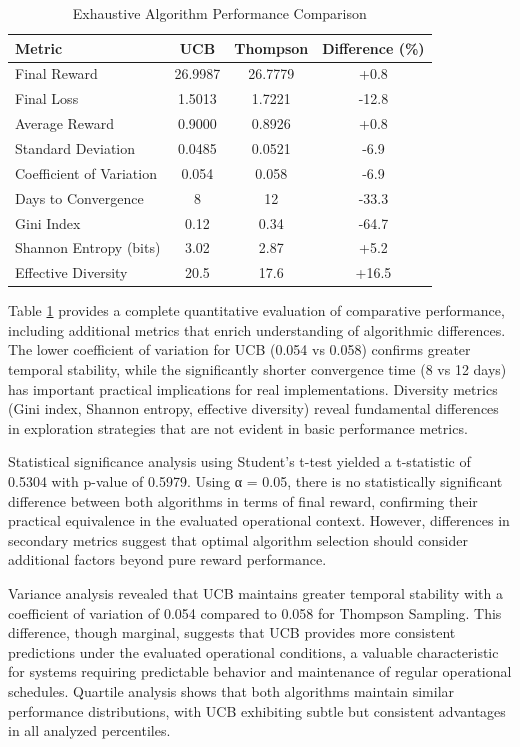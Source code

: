 \documentclass[conference]{IEEEtran}
\begin{document}
\begin{table}[H]
\centering
\caption{Exhaustive Algorithm Performance Comparison}
\label{tab:performance}
\begin{tabular}{lccc}
\toprule
\textbf{Metric} & \textbf{UCB} & \textbf{Thompson} & \textbf{Difference (\%)} \\
\midrule
Final Reward & 26.9987 & 26.7779 & +0.8 \\
Final Loss & 1.5013 & 1.7221 & -12.8 \\
Average Reward & 0.9000 & 0.8926 & +0.8 \\
Standard Deviation & 0.0485 & 0.0521 & -6.9 \\
Coefficient of Variation & 0.054 & 0.058 & -6.9 \\
Days to Convergence & 8 & 12 & -33.3 \\
Gini Index & 0.12 & 0.34 & -64.7 \\
Shannon Entropy (bits) & 3.02 & 2.87 & +5.2 \\
Effective Diversity & 20.5 & 17.6 & +16.5 \\
\bottomrule
\end{tabular}
\end{table}

Table \ref{tab:performance} provides a complete quantitative evaluation of comparative performance, including additional metrics that enrich understanding of algorithmic differences. The lower coefficient of variation for UCB (0.054 vs 0.058) confirms greater temporal stability, while the significantly shorter convergence time (8 vs 12 days) has important practical implications for real implementations. Diversity metrics (Gini index, Shannon entropy, effective diversity) reveal fundamental differences in exploration strategies that are not evident in basic performance metrics.

Statistical significance analysis using Student's t-test yielded a t-statistic of 0.5304 with p-value of 0.5979. Using α = 0.05, there is no statistically significant difference between both algorithms in terms of final reward, confirming their practical equivalence in the evaluated operational context. However, differences in secondary metrics suggest that optimal algorithm selection should consider additional factors beyond pure reward performance.

Variance analysis revealed that UCB maintains greater temporal stability with a coefficient of variation of 0.054 compared to 0.058 for Thompson Sampling. This difference, though marginal, suggests that UCB provides more consistent predictions under the evaluated operational conditions, a valuable characteristic for systems requiring predictable behavior and maintenance of regular operational schedules. Quartile analysis shows that both algorithms maintain similar performance distributions, with UCB exhibiting subtle but consistent advantages in all analyzed percentiles.
\end{document}
